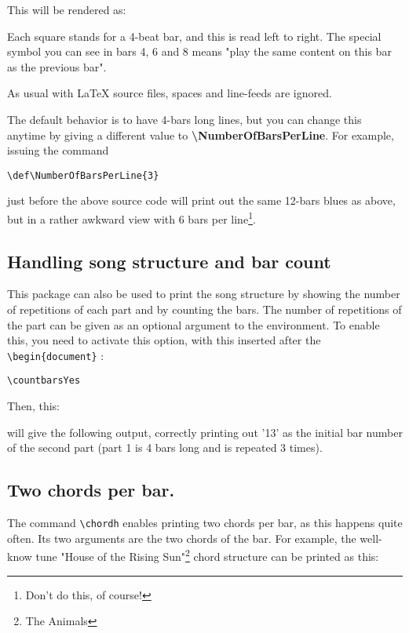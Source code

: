 \documentclass[11pt]{article}
\newcommand{\btt}{\bfseries \ttfamily }
\newcommand{\tbs}{\textbackslash{}}
\begin{document}
\def\chordFontSize{\huge\bfseries}



This will be rendered as:



Each square stands for a 4-beat bar, and this is read left to right.
The special symbol you can see in bars 4, 6 and 8 means "play the same content on this bar as the previous bar".

As usual with \LaTeX{} source files, spaces and line-feeds are ignored.

The default behavior is to have 4-bars long lines, but you can change this anytime by giving a different value to {\btt \tbs NumberOfBarsPerLine}. For example, issuing the command


\begin{lstlisting}
\def\NumberOfBarsPerLine{3}
\end{lstlisting}

just before the above source code will print out the same 12-bars blues as above, but in a rather awkward view with 6 bars per line\footnote{Don't do this, of course!}.

\def\NumberOfBarsPerLine{6}


\subsection{Handling song structure and bar count}

This package can also be used to print the song structure by showing the number of repetitions of each part and by counting the bars.
The number of repetitions of the part can be given as an optional argument to the environment.
To enable this, you need to activate this option, with this inserted after the \verb!\begin{document}! :

\begin{lstlisting}
\countbarsYes
\end{lstlisting}

Then, this:


will give the following output, correctly printing out '13' as the initial bar number of the second part (part 1 is 4 bars long and is repeated 3 times).

\def\NumberOfBarsPerLine{4}
\resetchordbars
\countbarsYes


\subsection{Two chords per bar.} 
The command \verb|\chordh| enables printing two chords per bar, as this happens quite often.
Its two arguments are the two chords of the bar.
For example, the well-know tune "House of the Rising Sun"\footnote{The Animals} chord structure can be printed as this:
\end{document}
